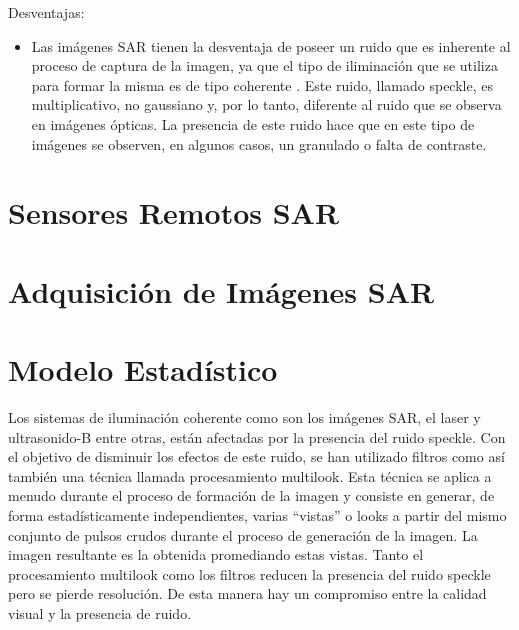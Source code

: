 Desventajas: 
\begin{itemize}
	\item Las imágenes SAR tienen la desventaja de poseer un ruido que es inherente al proceso de captura de la imagen, ya que el tipo de iliminación que se utiliza para formar la misma es de tipo coherente \cite{goodman85}. Este ruido, llamado speckle, es multiplicativo, no gaussiano y, por lo tanto, diferente al ruido que se observa en imágenes ópticas. La presencia de este ruido hace que en este tipo de imágenes se observen, en algunos casos, un granulado o falta de contraste.
\end{itemize}



\section{Sensores Remotos SAR}

\section{Adquisición de Imágenes SAR}

\section{Modelo Estadístico}

Los sistemas de iluminación coherente como son los imágenes SAR, el laser y ultrasonido-B entre otras, están afectadas por la presencia del ruido speckle. 
Con el objetivo de disminuir los efectos de este ruido, se han utilizado filtros como así también una técnica llamada procesamiento multilook.  Esta técnica se aplica a menudo durante el proceso de formación de la imagen y consiste en generar, de forma estadísticamente independientes, varias ``vistas'' o looks a partir del mismo conjunto de pulsos crudos durante el proceso de generación de la imagen. La imagen resultante es la obtenida promediando estas vistas. Tanto el procesamiento multilook como los filtros reducen la presencia del ruido speckle pero se pierde resolución. De esta manera hay un compromiso entre la calidad visual y la presencia de ruido. 

